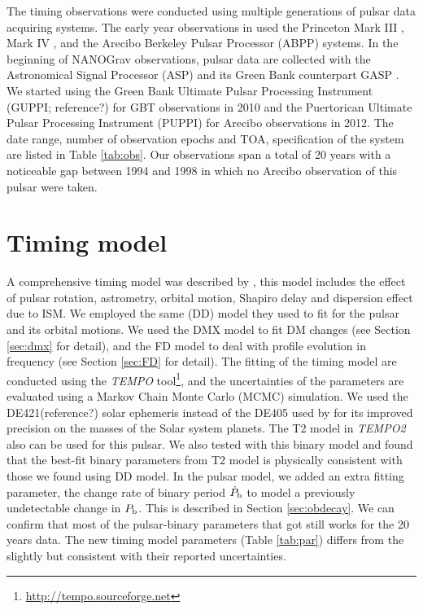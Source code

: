 The timing observations were conducted 
using multiple generations of pulsar data acquiring systems. The early year
observations in \citet{sns+05} used
 the Princeton Mark III \citep{skn+92}, Mark IV
\citep{sst+00}, and the Arecibo Berkeley Pulsar Processor (ABPP) systems. 
In the beginning of NANOGrav observations, pulsar data are collected with the Astronomical Signal
Processor (ASP) and its Green Bank counterpart GASP \citep{dem07}. We
started using 
the Green Bank Ultimate Pulsar Processing Instrument (GUPPI; reference?) for GBT 
observations in 2010 and the Puertorican Ultimate Pulsar Processing Instrument
(PUPPI) for Arecibo observations in 2012. 
The date range, number of observation epochs and TOA, specification of the
system are listed in Table \ref{tab:obs}.
Our observations span a total of 20 years with a noticeable gap between 1994
and 1998 in which no Arecibo observation of this pulsar were taken. 


\section{Timing model}
\label{sec:model}
A comprehensive timing model was described by \citet{sns+05}, this model includes the effect of pulsar rotation, astrometry, orbital motion, Shapiro delay and dispersion effect due to ISM.
We employed the same \citet{dd86} (DD) model they used to fit for the pulsar and
its orbital motions. We used the DMX model to fit DM changes (see Section
\ref{sec:dmx} for detail), and the FD model to deal with profile
evolution in frequency (see Section \ref{sec:FD} for detail). 
The fitting of the timing model are conducted using the \textit{TEMPO} tool\footnote{\url{http://tempo.sourceforge.net}}, and the uncertainties of the parameters are evaluated using a Markov Chain Monte Carlo (MCMC) simulation.
We used the DE421(reference?) solar ephemeris instead of the DE405 used by
\citet{sns+05} for its improved precision on the masses of the Solar system planets. The T2 model \citep{??} in \textit{TEMPO2} \citep{hem06} also can be used for this pulsar. We also tested with this binary model and found that the best-fit binary parameters from T2 model is physically consistent with those we found using DD model.
In the pulsar model, we added an extra fitting parameter, the change rate of binary period $\dot{P}_{\rm b}$ to model a previously undetectable change in $P_{\rm b}$. This is described in Section \ref{sec:obdecay}.    
We can confirm that most of the pulsar-binary parameters that \citet{sns+05} got still works for the 20 years data. The new timing model parameters (Table \ref{tab:par}) differs from the \citet{sns+05} slightly but consistent with their reported uncertainties.


